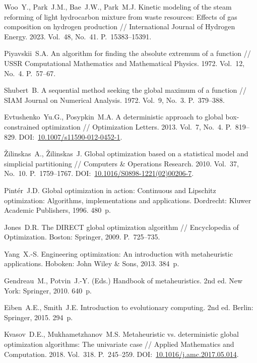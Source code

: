 \documentclass{cmi}
\begin{document}
\begin{biblio_lat}
Woo~Y., Park~J.M., Bae~J.W., Park~M.J. Kinetic modeling of the steam reforming of light hydrocarbon mixture from waste resources: Effects of gas composition on hydrogen production // International Journal of Hydrogen Energy. 2023. Vol.~48, No.~41. P.~15383--15391.

Piyavskii~S.A. An algorithm for finding the absolute extremum of a function // USSR Computational Mathematics and Mathematical Physics. 1972. Vol.~12, No.~4. P.~57--67.

Shubert~B. A sequential method seeking the global maximum of a function // SIAM Journal on Numerical Analysis. 1972. Vol.~9, No.~3. P.~379--388.

Evtushenko~Yu.G., Posypkin~M.A. A deterministic approach to global box-constrained optimization // Optimization Letters. 2013. Vol.~7, No.~4. P.~819--829. DOI:~\href{http://dx.doi.org/10.1007/s11590-012-0452-1}{10.1007/s11590-012-0452-1}.

Žilinskas~A., Žilinskas~J. Global optimization based on a statistical model and simplicial partitioning // Computers \& Operations Research. 2010. Vol.~37, No.~10. P.~1759--1767. DOI:~\href{http://dx.doi.org/10.1016/S0898-1221(02)00206-7}{10.1016/S0898-1221(02)00206-7}.

Pintér~J.D. Global optimization in action: Continuous and Lipschitz optimization: Algorithms, implementations and applications. Dordrecht: Kluwer Academic Publishers, 1996. 480~p.

Jones~D.R. The DIRECT global optimization algorithm // Encyclopedia of Optimization. Boston: Springer, 2009. P.~725--735.

Yang~X.-S. Engineering optimization: An introduction with metaheuristic applications. Hoboken: John Wiley \& Sons, 2013. 384~p.

Gendreau~M., Potvin~J.-Y. (Eds.) Handbook of metaheuristics. 2nd ed. New York: Springer, 2010. 640~p.

Eiben~A.E., Smith~J.E. Introduction to evolutionary computing. 2nd ed. Berlin: Springer, 2015. 294~p.

Kvasov~D.E., Mukhametzhanov~M.S. Metaheuristic vs. deterministic global optimization algorithms: The univariate case // Applied Mathematics and Computation. 2018. Vol.~318. P.~245--259. DOI:~\href{http://dx.doi.org/10.1016/j.amc.2017.05.014}{10.1016/j.amc.2017.05.014}.


\end{biblio_lat}
\end{document}
